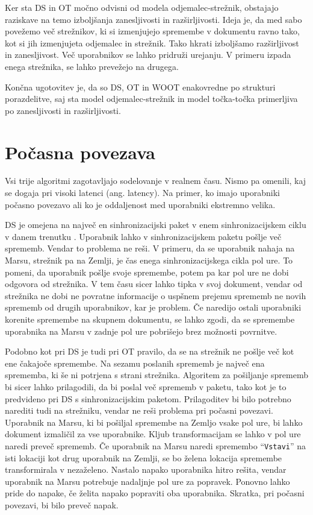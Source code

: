 \documentclass[a4paper, 12pt, twoside]{book}
\begin{document}
Ker sta DS in OT močno odvisni od modela odjemalec-strežnik, obstajajo raziskave \cite{diffsync} na temo izboljšanja zanesljivosti in razširljivosti. Ideja je, da med sabo povežemo več strežnikov, ki si izmenjujejo spremembe v dokumentu ravno tako, kot si jih izmenjujeta odjemalec in strežnik. Tako hkrati izboljšamo razširljivost in zanesljivost. Več uporabnikov se lahko pridruži urejanju. V primeru izpada enega strežnika, se lahko prevežejo na drugega.

Končna ugotovitev je, da so DS, OT in WOOT enakovredne po strukturi porazdelitve, saj sta model odjemalec-strežnik in model točka-točka primerljiva po zanesljivosti in razširljivosti.

\section{Počasna povezava}

Vsi trije algoritmi zagotavljajo sodelovanje v realnem času. Nismo pa omenili, kaj se dogaja pri visoki latenci (ang. latency). Na primer, ko imajo uporabniki počasno povezavo ali ko je oddaljenost med uporabniki ekstremno velika.

DS je omejena na največ en sinhronizacijski paket v enem sinhronizacijskem ciklu v danem trenutku \cite{diffsync}. Uporabnik lahko v sinhronizacijskem paketu pošlje več sprememb. Vendar to problema ne reši. V primeru, da se uporabnik nahaja na Marsu, strežnik pa na Zemlji, je čas enega sinhronizacijskega cikla pol ure. To pomeni, da uporabnik pošlje svoje spremembe, potem pa kar pol ure ne dobi odgovora od strežnika. V tem času sicer lahko tipka v svoj dokument, vendar od strežnika ne dobi ne povratne informacije o uspšnem prejemu sprememb ne novih sprememb od drugih uporabnikov, kar je problem. Če naredijo ostali uporabniki korenite spremembe na skupnem dokumentu, se lahko zgodi, da se spremembe uporabnika na Marsu v zadnje pol ure pobrišejo brez možnosti povrnitve.

Podobno kot pri DS je tudi pri OT pravilo, da se na strežnik ne pošlje več kot ene čakajoče spremembe. Na sezamu poslanih sprememb je največ ena sprememba, ki še ni potrjena s strani strežnika. Algoritem za pošiljanje sprememb bi sicer lahko prilagodili, da bi poslal več sprememb v paketu, tako kot je to predvideno pri DS s sinhronizacijskim paketom. Prilagoditev bi bilo potrebno narediti tudi na strežniku, vendar ne reši problema pri počasni povezavi. Uporabnik na Marsu, ki bi pošiljal spremembe na Zemljo vsake pol ure, bi lahko dokument izmaličil za vse uporabnike. Kljub transformacijam se lahko v pol ure naredi preveč sprememb. Če uporabnik na Marsu naredi spremembo “{\tt Vstavi}” na isti lokaciji kot drug uporabnik na Zemlji, se bo želena lokacija spremembe transformirala v nezaželeno. Nastalo napako uporabnika hitro rešita, vendar uporabnik na Marsu potrebuje nadaljnje pol ure za popravek. Ponovno lahko pride do napake, če želita napako popraviti oba uporabnika. Skratka, pri počasni povezavi, bi bilo preveč napak.
\end{document}
